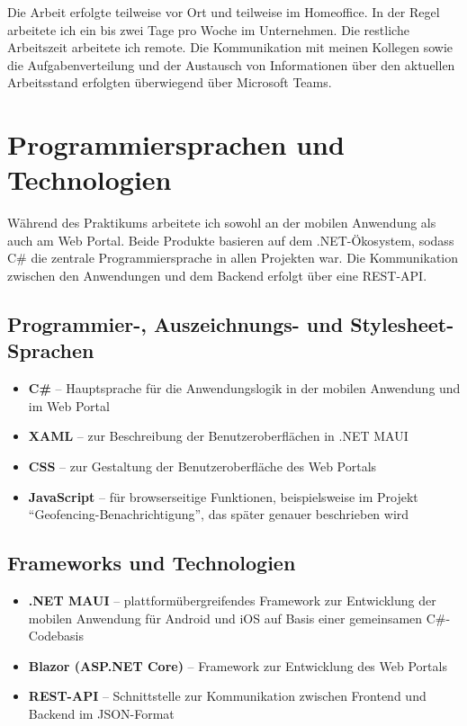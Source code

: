Die Arbeit erfolgte teilweise vor Ort und teilweise im Homeoffice. In der Regel arbeitete ich ein bis zwei Tage pro Woche im Unternehmen. Die restliche Arbeitszeit
arbeitete ich remote. Die Kommunikation mit meinen Kollegen sowie die Aufgabenverteilung und der Austausch von Informationen über den aktuellen Arbeitsstand
erfolgten überwiegend über Microsoft Teams. 

\section{Programmiersprachen und Technologien}

Während des Praktikums arbeitete ich sowohl an der mobilen Anwendung als auch am Web Portal. Beide Produkte basieren auf dem .NET-Ökosystem, 
sodass C\# die zentrale Programmiersprache in allen Projekten war. Die Kommunikation zwischen den Anwendungen und dem Backend erfolgt über eine REST-API.

\subsection{Programmier-, Auszeichnungs- und Stylesheet-Sprachen}
\begin{itemize}
    \item \textbf{C\#} – Hauptsprache für die Anwendungslogik in der mobilen Anwendung und im Web Portal
    \item \textbf{XAML} – zur Beschreibung der Benutzeroberflächen in .NET MAUI
    \item \textbf{CSS} – zur Gestaltung der Benutzeroberfläche des Web Portals
    \item \textbf{JavaScript} – für browserseitige Funktionen, beispielsweise im Projekt \enquote{Geofencing-Benachrichtigung}, 
                das später genauer beschrieben wird
\end{itemize}

\subsection{Frameworks und Technologien}
\begin{itemize}
    \item \textbf{.NET MAUI} – plattformübergreifendes Framework zur Entwicklung der mobilen Anwendung für Android und iOS 
                auf Basis einer gemeinsamen C\#-Codebasis
    \item \textbf{Blazor (ASP.NET Core)} – Framework zur Entwicklung des Web Portals
    \item \textbf{REST-API} – Schnittstelle zur Kommunikation zwischen Frontend und Backend im JSON-Format
\end{itemize}

